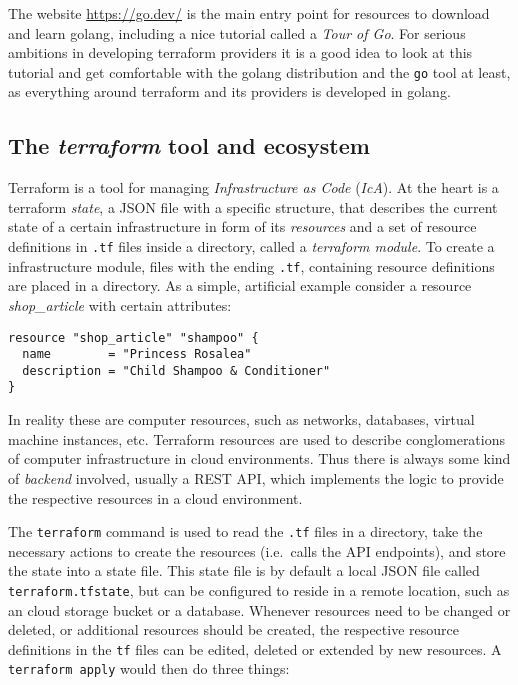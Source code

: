 \documentclass[paper=a4,11pt,numbers=noenddot]{article}
\begin{document}
The website \url{https://go.dev/} is the main entry point for resources to download and learn golang, including a nice tutorial called a \emph{Tour of Go}. For serious ambitions in developing terraform providers it is a good idea to look at this tutorial and get comfortable with the golang distribution and the \verb'go' tool at least, as everything around terraform and its providers is developed in golang.

\subsection{The \emph{terraform} tool and ecosystem}
\label{subsec:terr-tool-ecosyst}

Terraform is a tool for managing \emph{Infrastructure as Code} (\emph{IcA}). At the heart is a terraform \emph{state}, a JSON file with a specific structure, that describes the current state of a certain infrastructure in form of its \emph{resources} and a set of resource definitions in \verb'.tf' files inside a directory, called a \emph{terraform module}. To create a infrastructure module, files with the ending \verb'.tf', containing resource definitions are placed in a directory. As a simple, artificial example consider a resource \emph{shop\_article} with certain attributes:

\begin{lstlisting}
resource "shop_article" "shampoo" {
  name        = "Princess Rosalea"
  description = "Child Shampoo & Conditioner"
}
\end{lstlisting}

In reality these are computer resources, such as networks, databases, virtual machine instances, etc. Terraform resources are used to describe conglomerations of computer infrastructure in cloud environments. Thus there is always some kind of \emph{backend} involved, usually a REST API, which implements the logic to provide the respective resources in a cloud environment.

The \verb'terraform' command is used to read the \verb'.tf' files in a directory, take the necessary actions to create the resources (i.e.\ calls the API endpoints), and store the state into a state file. This state file is by default a local JSON file called \verb'terraform.tfstate', but can be configured to reside in a remote location, such as an cloud storage bucket or a database. Whenever resources need to be changed or deleted, or additional resources should be created, the respective resource definitions in the \verb'tf' files can be edited, deleted or extended by new resources. A \verb'terraform apply' would then do three things:
\end{document}

